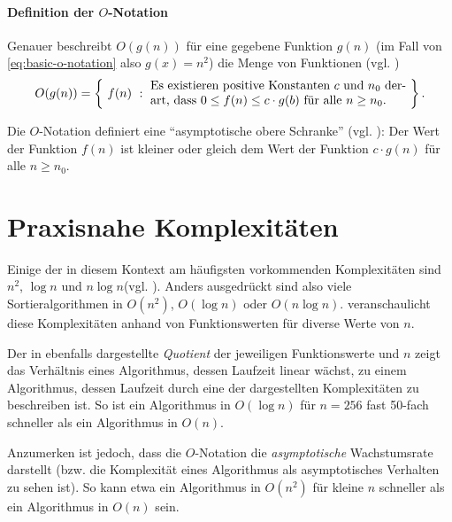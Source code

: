 \paragraph{Definition der $O$-Notation}

Genauer beschreibt $O(g(n))$ für eine gegebene Funktion $g(n)$ (im Fall von \eqref{eq:basic-o-notation} also $g(x) = n^2$) die Menge von Funktionen (vgl. \cite[37]{meh1984})
%
\begin{equation*}
    O(g(n))=\left\{\ 
        f(n)\ :\ \parbox{.6\textwidth}{
            Es existieren positive Konstanten $c$ und $n_0$ derart, dass $0 \leq f(n) \leq c \cdot g(b)$ für alle $n \geq n_0$.
        }
    \ \right\}.
\end{equation*}

Die $O$-Notation definiert eine \enquote{asymptotische obere Schranke} (vgl. \cite[64]{sha2011}): Der Wert der Funktion $f(n)$ ist kleiner oder gleich dem Wert der Funktion $c \cdot g(n)$ für alle $n \geq n_0$.

\section{Praxisnahe Komplexitäten}
\label{sec:praxisnahe-komplexitäten}

Einige der in diesem Kontext am häufigsten vorkommenden Komplexitäten sind $n^2$, $\log n$ und $n \log n$\footnotemark (vgl. \cite[38]{hsr1997}). Anders ausgedrückt sind also viele Sortieralgorithmen in $O(n^2)$, $O(\log n)$ oder $O(n \log n)$.  veranschaulicht diese Komplexitäten anhand von Funktionswerten für diverse Werte von $n$.


Der in  ebenfalls dargestellte \emph{Quotient} der jeweiligen Funktionswerte und $n$ zeigt das Verhältnis eines Algorithmus, dessen Laufzeit linear wächst, zu einem Algorithmus, dessen Laufzeit durch eine der dargestellten Komplexitäten zu beschreiben ist. So ist ein Algorithmus in $O(\log n)$ für $n = 256$ fast 50-fach schneller als ein Algorithmus in $O(n)$.

Anzumerken ist jedoch, dass die $O$-Notation die \emph{asymptotische} Wachstumsrate darstellt (bzw. die Komplexität eines Algorithmus als asymptotisches Verhalten zu sehen ist). So kann etwa ein Algorithmus in $O(n^2)$ für kleine $n$ schneller als ein Algorithmus in $O(n)$ sein.


